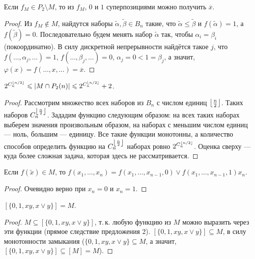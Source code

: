 \begin{lemma}
    Если $f_M \in P_2 \setminus M$, то из $f_M$, $0$ и $1$ суперпозициями можно получить $\overline{x}$.
\end{lemma}

\begin{proof}
    Из $f_M \notin M$, найдутся наборы $\widetilde{\alpha}, \widetilde{\beta} \in B_n$ такие, что $\widetilde{\alpha} \leqslant \widetilde{\beta}$ и $f(\widetilde{\alpha}) = 1$, а $f(\widetilde{\beta}) = 0$. Последовательно будем менять набор $\widetilde{\alpha}$ так, чтобы $\alpha_i = \beta_i$ (покоординатно). В силу дискретной непрерывности найдётся такое $j$, что $f(\ldots, \alpha_j, \ldots) = 1$, $f(\ldots, \beta_j, \ldots) = 0$, $\alpha_j = 0 < 1 = \beta_j$, а значит, $\varphi(x) = f(\ldots, x, \ldots) = \overline{x}$.
\end{proof}

\begin{proposal}
    $2^{C_n^{\left\lfloor n/2 \right\rfloor}} \leqslant \left\lvert M \cap P_2(n)\right\rvert \leqslant 2^{C_n^{\left\lfloor n/2 \right\rfloor}} + 2$.
\end{proposal}

\begin{proof}
    Рассмотрим множество всех наборов из $B_n$ с числом единиц $\left\lfloor \frac{n}{2} \right\rfloor$. Таких наборов $C_n^{\left\lfloor \frac{n}{2} \right\rfloor}$. Зададим функцию следующим образом: на всех таких наборах выберем значения произвольным образом, на наборах с меньшим числом единиц --- ноль, большим --- единицу. Все такие функции монотонны, а количество способов определить функцию на $C_n^{\left\lfloor \frac{n}{2} \right\rfloor}$ наборах ровно $2^{C_n^{\left\lfloor n/2 \right\rfloor}}$. Оценка сверху --- куда более сложная задача, которая здесь не рассматривается.
\end{proof}

\begin{proposal}
    Если $f(\widetilde{x}) \in M$, то $f(x_1, \ldots, x_n) = f(x_1, \ldots, x_{n-1}, 0) \vee f(x_1, \ldots, x_{n-1}, 1) x_n$.
\end{proposal}

\begin{proof}
    Очевидно верно при $x_n = 0$ и $x_n = 1$.
\end{proof}

\begin{proposal}
    $[\{0, 1, xy, x \vee y\}] = M$.
\end{proposal}

\begin{proof}
    $M \subseteq [\{0, 1, xy, x \vee y\}]$, т.\,к. любую функцию из $M$ можно выразить через эти функции (прямое следствие предложения 2).
    $[\{0, 1, xy, x \vee y\}] \subseteq M$, в силу монотонности замыкания ($\{0, 1, xy, x \vee y\}\subseteq M$, а значит, $[\{0, 1, xy, x \vee y\}] \subseteq [M] = M$).
\end{proof}
